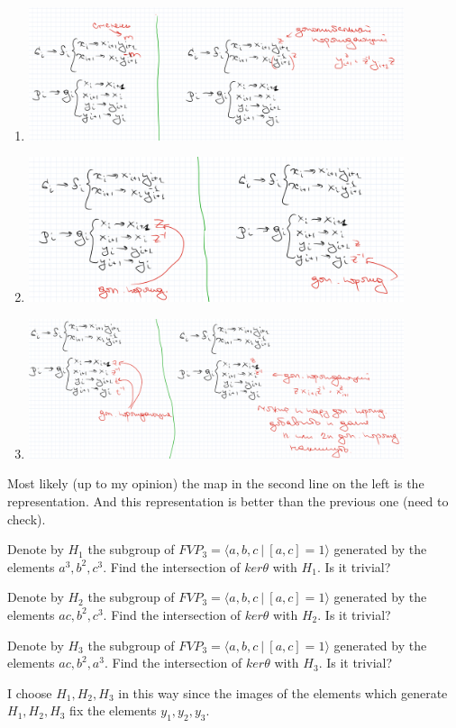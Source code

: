 \documentclass{article}
\begin{document}
\begin{enumerate}
    \item \includegraphics[width=110mm]{variant1.png}
     \item \includegraphics[width=110mm]{variant2.png}
      \item \includegraphics[width=110mm]{variant3.png}
\end{enumerate}
Most likely (up to my opinion) the map in the second line on the left is the representation. And this representation is better than the previous one (need to check).

Denote by $H_1$ the subgroup of $FVP_3=\langle a,b,c~|~[a,c]=1\rangle$ generated by the elements $a^3,b^2,c^3$. Find the intersection of $ker{\theta}$ with $H_1$. Is it trivial?

Denote by $H_2$ the subgroup of $FVP_3=\langle a,b,c~|~[a,c]=1\rangle$ generated by the elements $ac,b^2,c^3$. Find the intersection of $ker{\theta}$ with $H_2$. Is it trivial?

Denote by $H_3$ the subgroup of $FVP_3=\langle a,b,c~|~[a,c]=1\rangle$ generated by the elements $ac,b^2,a^3$. Find the intersection of $ker{\theta}$ with $H_3$. Is it trivial?

I choose $H_1,H_2,H_3$ in this way since the images of the elements which generate $H_1,H_2,H_3$ fix the elements $y_1,y_2,y_3$. 
\end{document}
